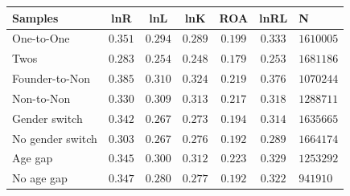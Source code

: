 \begin{tabular}{l*{5}{c}}
\hline\hline
Samples & lnR & lnL & lnK & ROA & lnRL & N \\
\hline
One-to-One & $0.351$ & $0.294$ & $0.289$ & $0.199$ & $0.333$ & $1610005$ \\
Twos & $0.283$ & $0.254$ & $0.248$ & $0.179$ & $0.253$ & $1681186$ \\
Founder-to-Non & $0.385$ & $0.310$ & $0.324$ & $0.219$ & $0.376$ & $1070244$ \\
Non-to-Non & $0.330$ & $0.309$ & $0.313$ & $0.217$ & $0.318$ & $1288711$ \\
Gender switch & $0.342$ & $0.267$ & $0.273$ & $0.194$ & $0.314$ & $1635665$ \\
No gender switch & $0.303$ & $0.267$ & $0.276$ & $0.192$ & $0.289$ & $1664174$ \\
Age gap & $0.345$ & $0.300$ & $0.312$ & $0.223$ & $0.329$ & $1253292$ \\
No age gap & $0.347$ & $0.280$ & $0.277$ & $0.192$ & $0.322$ & $941910$ \\
\hline\hline
\end{tabular}
